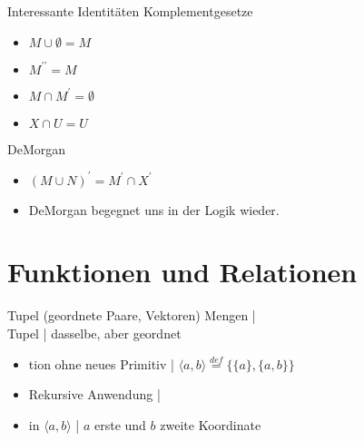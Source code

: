 \begin{frame}
  {Interessante Identitäten}
  \onslide<+->
  \onslide<+->
  Komplementgesetze\\
  \Halbzeile
  \begin{itemize}[<+->]
    \item $M\cup\emptyset=M$
    \item $M^{\prime\prime}=M$
    \item $M\cap M^{\prime}=\emptyset$
    \item $X\cap U=U$
  \end{itemize}
  \onslide<+->
  \Zeile
  DeMorgan\\
  \Halbzeile
  \begin{itemize}[<+->]
    \item $(M\cup N)^{\prime}=M^{\prime}\cap X^{\prime}$
    \item DeMorgan begegnet uns in der Logik wieder.
  \end{itemize}
\end{frame}

\section{Funktionen und Relationen}

\begin{frame}
  {Tupel (geordnete Paare, Vektoren)}
  \label{slide:tupel}
  \onslide<+->
  \onslide<+->
  Mengen |  \\
  \Viertelzeile
  \onslide<+->
  Tupel | dasselbe, aber \alert{geordnet} \\
  \Halbzeile
  \begin{itemize}[<+->]
    \item tion ohne neues Primitiv | \alert{$\langle a,b\rangle \stackrel{def}{=} \{\{a\},\{a,b\}\}$}
    \item Rekursive Anwendung | 
      \Halbzeile
    \item in $\langle a,b\rangle$ | $a$ \alert{erste} und $b$ \alert{zweite Koordinate}
  \end{itemize}
  \Halbzeile
\end{frame}

